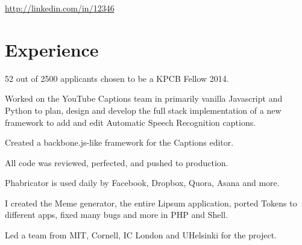 \documentclass[]{deedy-resume-openfont}
\begin{document}
%
%



\href{http://linkedin.com/in/12346}{http://linkedin.com/in/12346}

\section{Experience}

\vspace{\topsep} %
\begin{tightemize}
\item 52 out of 2500 applicants chosen to be a KPCB Fellow 2014.
\end{tightemize}
\sectionsep

\begin{tightemize}
\item Worked on the YouTube Captions team in primarily vanilla Javascript and Python to plan, design and develop the full stack implementation of a new framework to add and edit Automatic Speech Recognition captions.
\item Created a backbone.js-like framework for the Captions editor.
\item All code was reviewed, perfected, and pushed to production.
\end{tightemize}
\sectionsep

\begin{tightemize}
\item Phabricator is used daily by Facebook, Dropbox, Quora, Asana and more.
\item I created the Meme generator, the entire Lipsum application, ported Tokens to different apps, fixed many bugs and more in PHP and Shell.
\item Led a team from MIT, Cornell, IC London and UHelsinki for the project.
\end{tightemize}
\sectionsep
\end{document}
